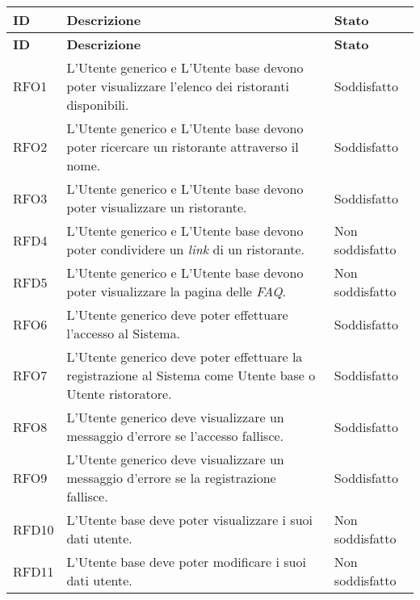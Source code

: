 \begin{longtable}{|l|p{}|p{3cm}|}
	\hline
	\textbf{ID} & \textbf{Descrizione}                                                                                                    & \textbf{Stato}  \\
	\endfirsthead
	\hline
	\textbf{ID} & \textbf{Descrizione}                                                                                                    & \textbf{Stato}  \\
	\hline
	\endhead
	\hline
	RFO1        & L'Utente generico e L'Utente base devono poter visualizzare l'elenco dei ristoranti disponibili.                        & Soddisfatto \\
	\hline
	RFO2        & L'Utente generico e L'Utente base devono poter ricercare un ristorante attraverso il nome.               				  & Soddisfatto \\
	\hline
	RFO3        & L'Utente generico e L'Utente base devono poter visualizzare un ristorante.                                              & Soddisfatto \\
	\hline
	RFD4        & L'Utente generico e L'Utente base devono poter condividere un \textit{link} di un ristorante.                           & Non soddisfatto \\
	\hline
	RFD5        & L'Utente generico e L'Utente base devono poter visualizzare la pagina delle  \textit{FAQ\g}.                            & Non soddisfatto \\
	\hline
	RFO6        & L'Utente generico deve poter effettuare l'accesso al Sistema.                                                           & Soddisfatto \\
	\hline
	RFO7        & L'Utente generico deve poter effettuare la registrazione al Sistema come Utente base o Utente ristoratore.              & Soddisfatto \\
	\hline
	RFO8        & L'Utente generico deve visualizzare un messaggio d'errore se l'accesso fallisce.                                        & Soddisfatto \\
	\hline
	RFO9        & L'Utente generico deve visualizzare un messaggio d'errore se la registrazione fallisce.                                 & Soddisfatto \\
	\hline
	RFD10       & L'Utente base deve poter visualizzare i suoi dati utente.                                                               & Non soddisfatto \\
	\hline
	RFD11       & L'Utente base deve poter modificare i suoi dati utente.                                                                 & Non soddisfatto \\

\end{longtable}
